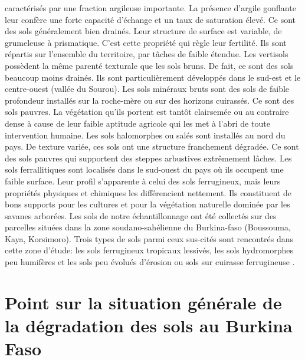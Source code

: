 \documentclass[a4paper,11pt]{article}
\begin{document}
caractérisés par une fraction argileuse importante. La présence
d'argile gonflante leur confère une forte capacité d'échange et un
taux de saturation élevé. Ce sont des sols généralement bien
drainés. Leur structure de surface est variable, de grumeleuse à
prismatique. C'est cette propriété qui règle leur fertilité. Ils sont
répartis sur l'ensemble du territoire, par tâches de faible
étendue. Les vertisols possèdent la même parenté texturale que les
sols bruns. De fait, ce sont des sols beaucoup moins drainés. Ils sont
particulièrement développés dans le sud-est et le centre-ouest (vallée
du Sourou). Les sols minéraux bruts sont des sols de faible profondeur
installés sur la roche-mère ou sur des horizons cuirassés. Ce sont des
sols pauvres. La végétation qu'ils portent est tantôt clairsemée ou au
contraire dense à cause de leur faible aptitude agricole qui les met à
l'abri de toute intervention humaine. Les sols halomorphes ou salés
sont installés au nord du pays. De texture variée, ces sols ont une
structure franchement dégradée. Ce sont des sols pauvres qui
supportent des steppes arbustives extrêmement lâches. Les sols
ferrallitiques sont localisés dans le sud-ouest du pays où ils
occupent une faible surface. Leur profil s'apparente à celui des sols
ferrugineux, mais leurs propriétés physiques et chimiques les
différencient nettement. Ils constituent de bons supports pour les
cultures et pour la végétation naturelle dominée par les savanes
arborées. Les sols de notre échantillonnage ont été collectés sur des
parcelles situées dans la zone soudano-sahélienne du Burkina-faso
(Boussouma, Kaya, Korsimoro). Trois types de sols parmi ceux sus-cités
sont rencontrés dans cette zone d'étude: les sols ferrugineux
tropicaux lessivés, les sols hydromorphes peu humifères et les sols
peu évolués d'érosion ou sols sur cuirasse ferrugineuse
\cite{TIROGO_2017}.

\section{Point sur la situation générale de la dégradation des sols au Burkina Faso}
\end{document}
